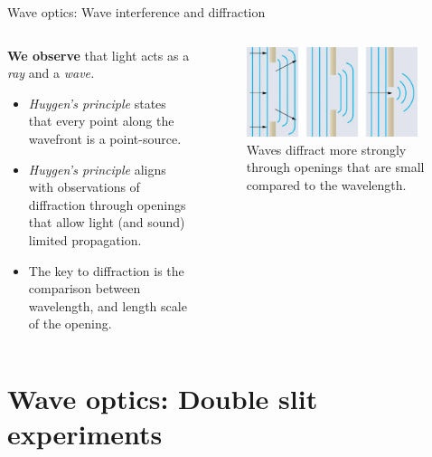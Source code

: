 \documentclass{beamer}
\begin{document}
\begin{frame}{Wave optics: Wave interference and diffraction}
\begin{columns}[T]
\begin{column}{0.5\textwidth}
\small
\textbf{We observe} that light acts as a \textit{ray} and a \textit{wave.}
\begin{itemize}
\item \textit{Huygen's principle} states that every point along the wavefront is a point-source.
\item \textit{Huygen's principle} aligns with observations of diffraction through openings that allow light (and sound) limited propagation.
\item The key to diffraction is the comparison between wavelength, and length scale of the opening.
\end{itemize}
\end{column}
\begin{column}{0.5\textwidth}
\begin{figure}
\centering
\includegraphics[width=0.95\textwidth]{figures/wave6.png}
\caption{\label{fig:wave6} \footnotesize Waves diffract more strongly through openings that are small compared to the wavelength.}
\end{figure}
\end{column}
\end{columns}
\end{frame}

\section{Wave optics: Double slit experiments}
\end{document}
